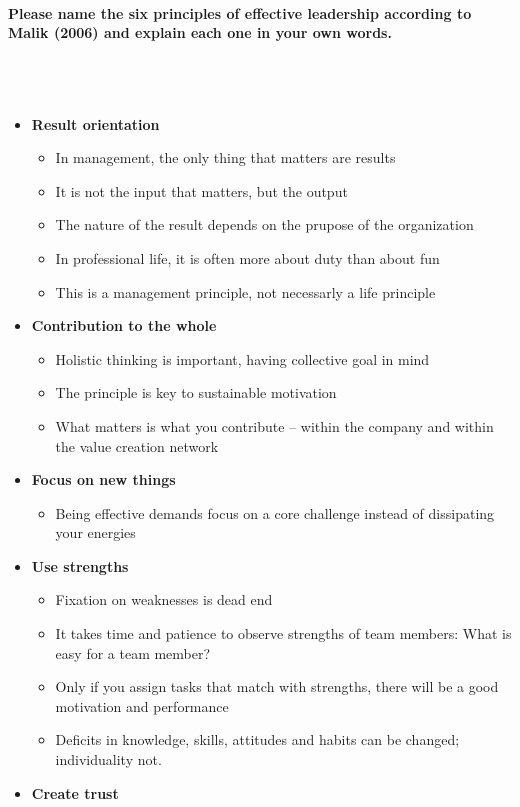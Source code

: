 \documentclass[10pt,a4paper,noendnumber=true]{scrartcl}
\newcommand{\properparagraph}[1]{\paragraph{\textcolor{Emerald}{#1}}\mbox{}\\}
\begin{document}
\properparagraph{Please name the six principles of effective leadership according to Malik (2006) and explain each one in your own words.}
\\[-6ex]
\begin{itemize}
	\item \textbf{Result orientation}
		\begin{itemize}
			\item In management, the only thing that matters are results
			\item It is not the input that matters, but the output
			\item The nature of the result depends on the prupose of the organization
			\item In professional life, it is often more about duty than about fun
			\item This is a management principle, not necessarly a life principle
		\end{itemize}
		\item \textbf{Contribution to the whole}
		\begin{itemize}
			\item Holistic thinking is important, having collective goal in mind
			\item The principle is key to sustainable motivation
			\item What matters is what you contribute -- within the company and within the value creation network
		\end{itemize}
		\item \textbf{Focus on new things}
		\begin{itemize}
			\item Being effective demands focus on a core challenge instead of dissipating your energies
		\end{itemize}
		\item \textbf{Use strengths}
		\begin{itemize}
			\item Fixation on weaknesses is dead end
			\item It takes time and patience to observe strengths of team members: What is easy for a team member?
			\item Only if you assign tasks that match with strengths, there will be a good motivation and performance
			\item Deficits in knowledge, skills, attitudes and habits can be changed; individuality not.
		\end{itemize}
		\item\textbf{Create trust}

\end{itemize}
\end{document}
